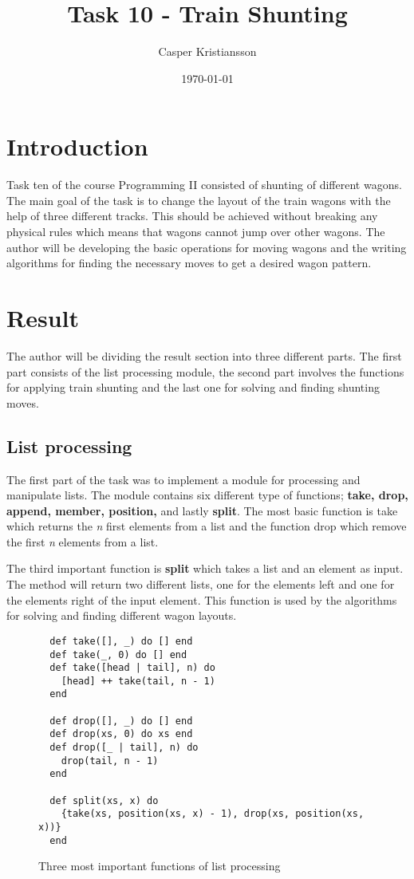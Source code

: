 \documentclass[a4paper,11pt]{article}
\begin{document}
\title{
    \textbf{Task 10 - Train Shunting}
}
\author{Casper Kristiansson}
\date{\today}

\maketitle

\section*{Introduction}
Task ten of the course Programming II consisted of shunting of different wagons. The main goal of the task is to change the layout of the train wagons with the help of three different tracks. This should be achieved without breaking any physical rules which means that wagons cannot jump over other wagons. The author will be developing the basic operations for moving wagons and the writing algorithms for finding the necessary moves to get a desired wagon pattern.

\section*{Result}
The author will be dividing the result section into three different parts. The first part consists of the list processing module, the second part involves the functions for applying train shunting and the last one for solving and finding shunting moves.

\subsection*{List processing}
The first part of the task was to implement a module for processing and manipulate lists. The module contains six different type of functions; \textbf{take, drop, append, member, position,} and lastly \textbf{split}. The most basic function is take which returns the \textit{n} first elements from a list and the function drop which remove the first \textit{n} elements from a list.

The third important function is \textbf{split} which takes a list and an element as input. The method will return two different lists, one for the elements left and one for the elements right of the input element. This function is used by the algorithms for solving and finding different wagon layouts.

\begin{figure}[H]
\begin{verbatim}
  def take([], _) do [] end
  def take(_, 0) do [] end
  def take([head | tail], n) do
    [head] ++ take(tail, n - 1)
  end
  
  def drop([], _) do [] end
  def drop(xs, 0) do xs end
  def drop([_ | tail], n) do
    drop(tail, n - 1)
  end
  
  def split(xs, x) do
    {take(xs, position(xs, x) - 1), drop(xs, position(xs, x))}
  end
\end{verbatim}
\caption{Three most important functions of list processing}
\label{Figure:1}
\end{figure}
\end{document}
